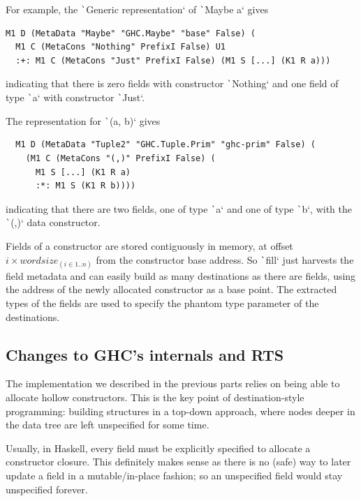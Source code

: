 \documentclass[english]{jflart}
\begin{document}
For example, the \texttt`Generic representation` of \texttt`Maybe a` gives

{\small
\begin{verbatim}
M1 D (MetaData "Maybe" "GHC.Maybe" "base" False) (
  M1 C (MetaCons "Nothing" PrefixI False) U1
  :+: M1 C (MetaCons "Just" PrefixI False) (M1 S [...] (K1 R a)))
\end{verbatim}
}

indicating that there is zero fields with constructor \texttt`Nothing` and one field of type \texttt`a` with constructor \texttt`Just`. 


The representation for \texttt`(a, b)` gives

{\small
\begin{verbatim}
  M1 D (MetaData "Tuple2" "GHC.Tuple.Prim" "ghc-prim" False) (
    (M1 C (MetaCons "(,)" PrefixI False) (
      M1 S [...] (K1 R a)
      :*: M1 S (K1 R b))))
\end{verbatim}
}

indicating that there are two fields, one of type \texttt`a` and one of type \texttt`b`, with the \texttt`(,)` data constructor.

Fields of a constructor are stored contiguously in memory, at offset $i \times \textit{wordsize}_{(i \in 1..n)}$ from the constructor base address. So \texttt`fill` just harvests the field metadata and can easily build as many destinations as there are fields, using the address of the newly allocated constructor as a base point. The extracted types of the fields are used to specify the phantom type parameter of the destinations.

\subsection{Changes to GHC's internals and RTS}

The implementation we described in the previous parts relies on being able to allocate hollow constructors. This is the key point of destination-style programming: building structures in a top-down approach, where nodes deeper in the data tree are left unspecified for some time.

Usually, in Haskell, every field must be explicitly specified to allocate a constructor closure. This definitely makes sense as there is no (safe) way to later update a field in a mutable/in-place fashion; so an unspecified field would stay unspecified forever.
\end{document}
